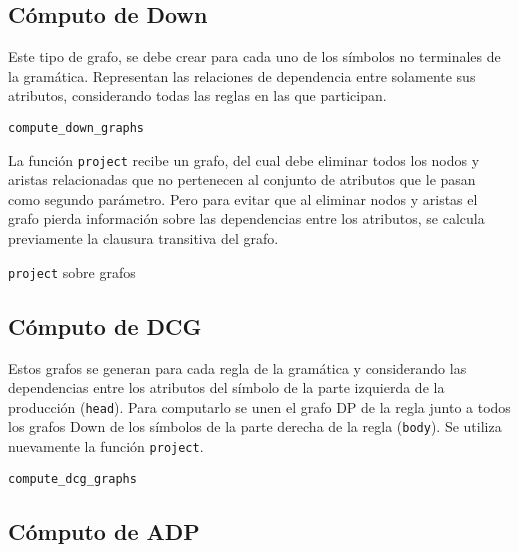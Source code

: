 \subsection{Cómputo de Down}

Este tipo de grafo, se debe crear para cada uno de los símbolos no terminales de la gramática. Representan las relaciones de dependencia entre solamente sus atributos, considerando todas las reglas en las que participan.

\begin{algorithm}[H]

\caption{\texttt{compute\_down\_graphs}}
\end{algorithm}

La función \texttt{project} recibe un grafo, del cual debe eliminar todos los nodos y aristas relacionadas que no pertenecen al conjunto de atributos que le pasan como segundo parámetro. Pero para evitar que al eliminar nodos y aristas el grafo pierda información sobre las dependencias entre los atributos, se calcula previamente la clausura transitiva del grafo.

\begin{algorithm}[H]

\caption{\texttt{project} sobre grafos}
\end{algorithm}

\subsection{Cómputo de DCG}

Estos grafos se generan para cada regla de la gramática y considerando las dependencias entre los atributos del símbolo de la parte izquierda de la producción (\texttt{head}). Para computarlo se unen el grafo DP de la regla junto a todos los grafos Down de los símbolos de la parte derecha de la regla (\texttt{body}). Se utiliza nuevamente la función \texttt{project}.

\begin{algorithm}[H]

\caption{\texttt{compute\_dcg\_graphs}}
\end{algorithm}

\subsection{Cómputo de ADP}

